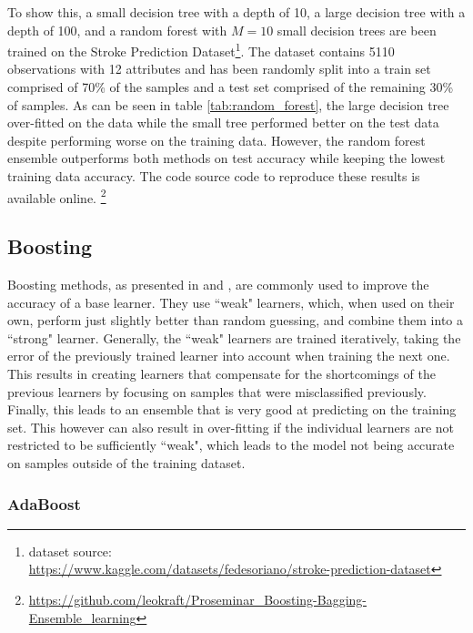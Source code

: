 To show this, a small decision tree with a depth of 10, a large decision tree with a depth of 100, and a random forest with $M=10$ small decision trees are been trained on the Stroke Prediction Dataset\footnote{dataset source:\\\hphantom{~}\hspace{1.465em}\url{https://www.kaggle.com/datasets/fedesoriano/stroke-prediction-dataset}}. The dataset contains 5110 observations with 12 attributes and has been randomly split into a train set comprised of 70\% of the samples and a test set comprised of the remaining 30\% of samples. As can be seen in table \ref{tab:random_forest}, the large decision tree over-fitted on the data while the small tree performed better on the test data despite performing worse on the training data. However, the random forest ensemble outperforms both methods on test accuracy while keeping the lowest training data accuracy. The code source code to reproduce these results is available online. \footnote{\url{https://github.com/leokraft/Proseminar_Boosting-Bagging-Ensemble_learning}}



\subsection{Boosting}
Boosting methods, as presented in \citep{RobertE.Schapire.1999} and \citep{Freund.1997}, are commonly used to improve the accuracy of a base learner. They use ``weak" learners, which, when used on their own, perform just slightly better than random guessing, and combine them into a ``strong" learner. Generally, the ``weak" learners are trained iteratively, taking the error of the previously trained learner into account when training the next one. This results in creating learners that compensate for the shortcomings of the previous learners by focusing on samples that were misclassified previously. Finally, this leads to an ensemble that is very good at predicting on the training set. This however can also result in over-fitting if the individual learners are not restricted to be sufficiently ``weak", which leads to the model not being accurate on samples outside of the training dataset.

\subsubsection{AdaBoost}

